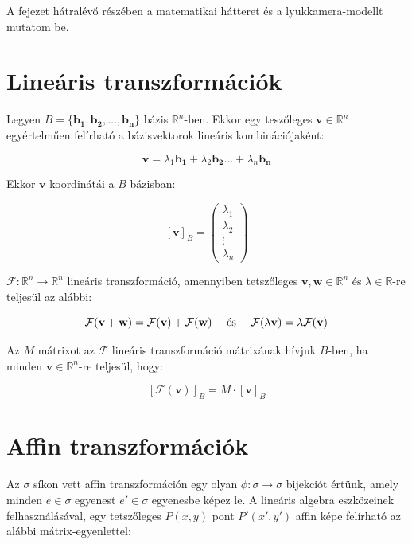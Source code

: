A fejezet hátralévő részében a matematikai hátteret és a lyukkamera-modellt mutatom be.

\section{Lineáris transzformációk}

Legyen $B = \{\mathbf{b_1}, \mathbf{b_2}, \ldots, \mathbf{b_n}\}$ bázis $\mathbb{R}^n$-ben. Ekkor egy teszőleges $\mathbf{v} \in \mathbb{R}^n$ egyértelműen felírható a bázisvektorok lineáris kombinációjaként:

\[\mathbf{v} = \lambda_1\mathbf{b_1} + \lambda_2\mathbf{b_2} \ldots + \lambda_n\mathbf{b_n}\]

Ekkor $\mathbf{v}$ koordinátái a $B$ bázisban:

\[[\mathbf{v}]_B = \left(\begin{array}{c} \lambda_1\\ \lambda_2\\ \vdots\\ \lambda_n\end{array}\right)\]

$\mathcal{F}: \mathbb{R}^n \rightarrow \mathbb{R}^n$ lineáris transzformáció, amennyiben tetszőleges $\mathbf{v}, \mathbf{w} \in \mathbb{R}^n$ és $\lambda \in \mathbb{R}$-re teljesül az alábbi:

\[\mathcal{F}(\mathbf{v} + \mathbf{w}) = \mathcal{F}(\mathbf{v}) + \mathcal{F}(\mathbf{w}) \quad \hbox{ és } \quad \mathcal{F}(\lambda\mathbf{v}) = \lambda\mathcal{F}(\mathbf{v})\]

Az $M$ mátrixot az $\mathcal{F}$  lineáris transzformáció mátrixának hívjuk $B$-ben, ha minden $\mathbf{v}\in \mathbb{R}^n$-re teljesül, hogy:

\[[\mathcal{F}(\mathbf{v})]_B = M \cdot [\mathbf{v}]_B\]

\section{Affin transzformációk}

Az $\sigma$ síkon vett affin transzformáción egy olyan $\phi : \sigma \rightarrow \sigma$ bijekciót értünk, amely minden $e\in\sigma$ egyenest $e'\in\sigma$ egyenesbe képez le. A lineáris algebra eszközeinek felhasználásával, egy tetszőleges $P(x, y)$ pont $P'(x', y')$ affin képe felírható az alábbi mátrix-egyenlettel:

